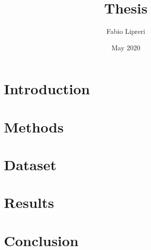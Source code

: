 \documentclass[12pt]{report}
\title{Thesis}
\author{Fabio Lipreri}
\date{May 2020}
\begin{document}
\maketitle

\tableofcontents{}

\chapter{Introduction}


\chapter{Methods}


\chapter{Dataset}


\chapter{Results}


\chapter{Conclusion}



\printbibliography
\end{document}
